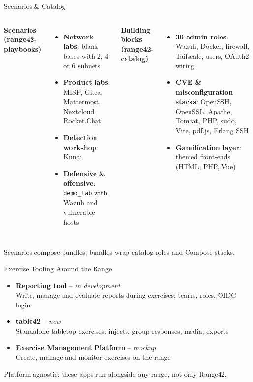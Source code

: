 \documentclass[aspectratio=169]{beamer}
\begin{document}
\begin{frame}[shrink=8]{Scenarios \& Catalog \; \faBoxOpen}
  \color{cyber-ink}
  \begin{columns}[T]
    \textbf{Scenarios (range42-playbooks)}
    \begin{itemize}
      \item \textbf{Network labs}: blank bases with 2, 4 or 6 subnets
      \item \textbf{Product labs}: MISP, Gitea, Mattermost, Nextcloud, Rocket.Chat
      \item \textbf{Detection workshop}: Kunai
      \item \textbf{Defensive \& offensive}: \texttt{demo\_lab} with Wazuh and vulnerable hosts
    \end{itemize}

    \textbf{Building blocks (range42-catalog)}
    \begin{itemize}
      \item \textbf{30 admin roles}: Wazuh, Docker, firewall, Tailscale, users, OAuth2 wiring
      \item \textbf{CVE \& misconfiguration stacks}: OpenSSH, OpenSSL, Apache, Tomcat, PHP, sudo, Vite, pdf.js, Erlang SSH
      \item \textbf{Gamification layer}: themed front-ends (HTML, PHP, Vue)
    \end{itemize}
  \end{columns}
  \vspace{2mm}
  \begin{tcolorbox}
    \faInfoCircle\; Scenarios compose bundles; bundles wrap catalog roles and Compose stacks.
  \end{tcolorbox}
\end{frame}

\begin{frame}{Exercise Tooling Around the Range \; \faClipboardList}
  \begin{itemize}
    \item \textbf{Reporting tool} -- \emph{in development}\\
      {\footnotesize Write, manage and evaluate reports during exercises; teams, roles, OIDC login}
    \item \textbf{table42} -- \emph{new}\\
      {\footnotesize Standalone tabletop exercises: injects, group responses, media, exports}
    \item \textbf{Exercise Management Platform} -- \emph{mockup}\\
      {\footnotesize Create, manage and monitor exercises on the range}
  \end{itemize}
  \vspace{2mm}
  \begin{tcolorbox}
    \faInfoCircle\; Platform-agnostic: these apps run alongside any range, not only Range42.
  \end{tcolorbox}
\end{frame}
\end{document}
